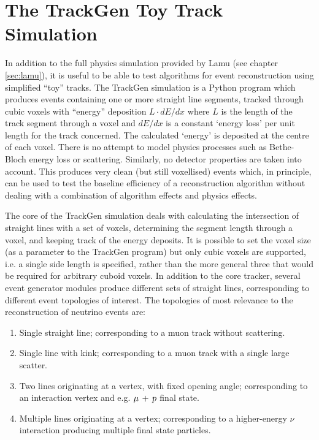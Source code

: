 \section{The TrackGen Toy Track Simulation}
In addition to the full physics simulation provided by Lamu (see chapter \ref{sec:lamu}), it is useful to be able to test algorithms for event reconstruction using simplified ``toy'' tracks. The TrackGen simulation is a Python program which produces events containing one or more straight line segments, tracked through cubic voxels with ``energy'' deposition $L\cdot dE/dx$ where $L$ is the length of the track segment through a voxel and $dE/dx$ is a constant `energy loss' per unit length for the track concerned. The calculated `energy' is deposited at the centre of each voxel. There is no attempt to model physics processes such as Bethe-Bloch energy loss or scattering. Similarly, no detector properties are taken into account. This produces very clean (but still voxellised) events which, in principle, can be used to test the baseline efficiency of a reconstruction algorithm without dealing with a combination of algorithm effects and physics effects.

The core of the TrackGen simulation deals with calculating the intersection of straight lines with a set of voxels, determining the segment length through a voxel, and keeping track of the energy deposits. It is possible to set the voxel size (as a parameter to the TrackGen program) but only cubic voxels are supported, i.e. a single side length is specified, rather than the more general three that would be required for arbitrary cuboid voxels. In addition to the core tracker, several event generator modules produce different sets of straight lines, corresponding to different event topologies of interest. The topologies of most relevance to the reconstruction of neutrino events are:

\begin{enumerate}
    \item Single straight line; corresponding to a muon track without scattering.
    \item Single line with kink; corresponding to a muon track with a single large scatter.
    \item Two lines originating at a vertex, with fixed opening angle; corresponding to an interaction vertex and e.g. $\mu\,+\,p$ final state.
    \item Multiple lines originating at a vertex; corresponding to a higher-energy $\nu$ interaction producing multiple final state particles.
\end{enumerate}

